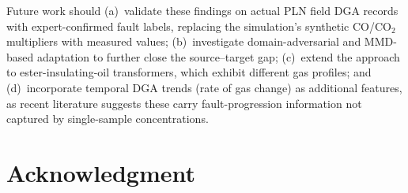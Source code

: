 \documentclass[conference]{IEEEtran}
\begin{document}
Future work should (a)~validate these findings on actual PLN
field DGA records with expert-confirmed fault labels, replacing the
simulation's synthetic CO/CO$_2$ multipliers with measured values;
(b)~investigate domain-adversarial and MMD-based adaptation to
further close the source--target gap;
(c)~extend the approach to ester-insulating-oil transformers,
which exhibit different gas profiles; and
(d)~incorporate temporal DGA trends (rate of gas change) as
additional features, as recent literature suggests these carry
fault-progression information not captured by single-sample
concentrations.

\section*{Acknowledgment}
\end{document}
